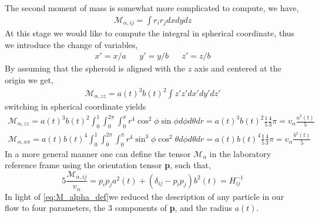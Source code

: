The second moment of mass is somewhat more complicated to compute, we have, 
\begin{align*}
    \mathcal{M}_{\alpha,ij}
    = \int r_ir_j dxdydz
\end{align*}
At this stage we would like to compute the integral in spherical coordinate, thus we introduce the change of variables, 
\begin{align*}
    x' = x/a 
    && y' = y/b 
    && z' = z/b 
\end{align*}
By assuming that the spheroid is aligned with the $z$ axis and centered at the origin we get, 
\begin{align*}
    \mathcal{M}_{\alpha,zz}
    = a(t)^3 b(t)^2 \int z'z' dx'dy'dz'
\end{align*}
switching in spherical coordinate yields 
\begin{align*}
    \mathcal{M}_{\alpha,zz}
    = a(t)^3 b(t)^2 \int_0^1 \int_0^{2\pi}\int_0^\pi r^4 \cos^2\phi \sin\phi d\phi d\theta dr
    = a(t)^3 b(t)^2 \frac{1}{5}\frac{4}{3} \pi
    = v_\alpha \frac{a^2(t)}{5}\\
    \mathcal{M}_{\alpha,xx}
    = a(t) b(t)^4 \int_0^1 \int_0^{2\pi}\int_0^\pi r^4 \sin^3\phi\cos^2\theta d\phi d\theta dr
    = a(t) b(t)^4
    \frac{1}{5}
     \frac{4}{3}
     \pi
     =v_\alpha \frac{b^2(t)}{5}
\end{align*}
In a more general manner one can define the tensor $\mathcal{M}_\alpha$ in the laboratory reference frame using the orientation tensor \textbf{p}, such that, 
\begin{equation}
    5 \frac{\mathcal{M}_{\alpha,ij}}{v_\alpha}
    = p_i p_j 
    a^2(t) 
    + (\delta_{ij} - p_ip_j) b^2(t)
    = H_{ij}^{-1}
    \label{eq:M_alpha_def}
\end{equation} 
In light of \ref{eq:M_alpha_def}we reduced the description of any particle in our flow to four parameters, the 3 components of \textbf{p}, and the radius $a(t)$. 



